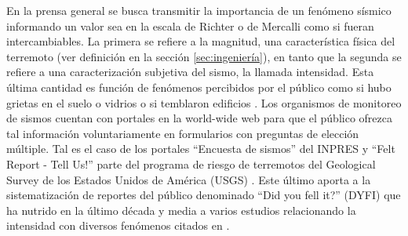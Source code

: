 \documentclass[a4paper]{report}
\begin{document}
%
%

En la prensa general se busca transmitir la importancia de un fenómeno sísmico informando un valor sea en la escala de Richter o de Mercalli como si fueran intercambiables.
La primera se refiere a la magnitud, una característica física del terremoto (ver definición en la sección \ref{sec:ingeniería}), en tanto que la segunda se refiere a una caracterización subjetiva del sismo, la llamada intensidad.
Esta última cantidad es función de fenómenos percibidos por el público como si hubo grietas en el suelo o vidrios o si temblaron edificios \cite[sección 4.2.3]{fowler_solid_1990}.
Los organismos de monitoreo de sismos cuentan con portales en la world-wide web para que el público ofrezca tal información voluntariamente en formularios con preguntas de elección múltiple.
Tal es el caso de los portales ``Encuesta de sismos'' del INPRES \cite{noauthor_encuesta_nodate} y ``Felt Report - Tell Us!'' \cite{noauthor_felt_nodate} parte del programa de riesgo de terremotos del Geological Survey de los Estados Unidos de América (USGS) \cite{david_jay_usgs_2012}. 
Este último aporta a la sistematización de reportes del público denominado ``Did you fell it?'' (DYFI) que ha nutrido en la último década y media a varios estudios relacionando la intensidad con diversos fenómenos citados en \cite{noauthor_dyfi_nodate}.
\end{document}
